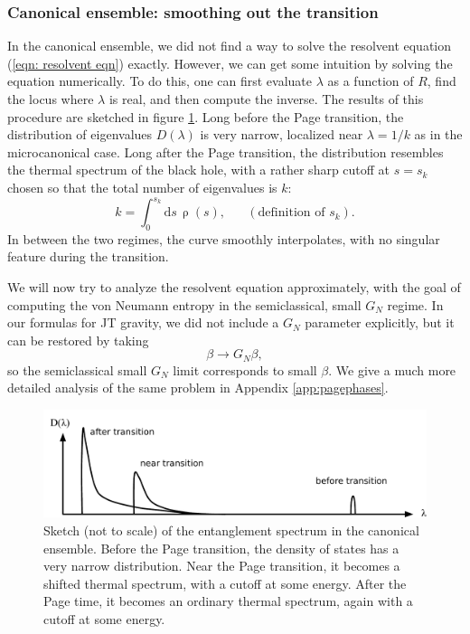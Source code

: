 \documentclass[12pt]{article}
\newcommand{\be}{\begin{equation}}
\newcommand{\ee}{\end{equation}}
\numberwithin{equation}{section}
\begin{document}
\subsubsection{Canonical ensemble: smoothing out the transition}
In the canonical ensemble, we did not find a way to solve the resolvent equation (\ref{eqn: resolvent eqn}) exactly. However, we can get some intuition by solving the equation numerically. To do this, one can first evaluate $\lambda$ as a function of $R$, find the locus where $\lambda$ is real, and then compute the inverse. The results of this procedure are sketched in figure \ref{fig:densitydistribution}. Long before the Page transition, the distribution of eigenvalues $D(\lambda)$ is very narrow, localized near $\lambda = 1/k$ as in the microcanonical case. Long after the Page transition, the distribution resembles the thermal spectrum of the black hole, with a rather sharp cutoff at $s = s_k$ chosen so that the total number of eigenvalues is $k$:
\be \label{eq:defskmaintext}
k = \int_0^{s_k}\mathrm{d}s\,{\uprho}(s), \hspace{20pt} (\text{definition of $s_k$}).
\ee
In between the two regimes, the curve smoothly interpolates, with no singular feature during the transition.

We will now try to analyze the resolvent equation approximately, with the goal of computing the von Neumann entropy in the semiclassical, small $G_N$ regime. In our formulas for JT gravity, we did not include a $G_N$ parameter explicitly, but it can be restored by taking
\be
\beta \rightarrow  G_N \beta,
\ee
so the semiclassical small $G_N$ limit corresponds to small $\beta$. We give a much more detailed analysis of the same problem in Appendix \ref{app:pagephases}.
\begin{figure}[t]
\centering
	\includegraphics[scale=0.65]{images/densitydistribution2.pdf}
	\caption{Sketch (not to scale) of the entanglement spectrum in the canonical ensemble. Before the Page transition, the density of states has a very narrow distribution. Near the Page transition, it becomes a shifted thermal spectrum, with a cutoff at some energy. After the Page time, it becomes an ordinary thermal spectrum, again with a cutoff at some energy.}
	\label{fig:densitydistribution}
\end{figure}
\end{document}
